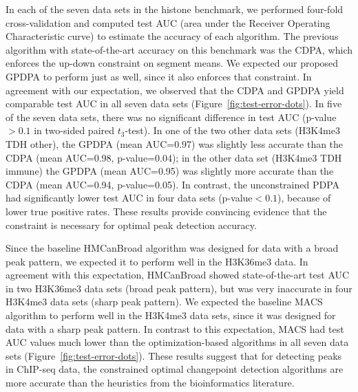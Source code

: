 \documentclass[aoas]{imsart}
\begin{document}
In each of the seven data sets in the histone benchmark,
we performed four-fold cross-validation and computed test AUC (area
under the Receiver Operating Characteristic curve) to estimate the
accuracy of each algorithm. The previous algorithm with
state-of-the-art accuracy on this benchmark was the CDPA, which
enforces the up-down constraint on segment means. We expected our
proposed GPDPA to perform just as well, since it also enforces that
constraint. In agreement with our expectation, we observed that the
CDPA and GPDPA yield comparable test AUC in all seven data sets
(Figure~\ref{fig:test-error-dots}). In five of the seven data sets,
there was no significant difference in test AUC (p-value$>0.1$ in
two-sided paired $t_3$-test). In one of the two other data sets
(H3K4me3 TDH other), the GPDPA (mean AUC=0.97) was slightly less
accurate than the CDPA (mean AUC=0.98, p-value=0.04); in the other
data set (H3K4me3 TDH immune) the GPDPA (mean AUC=0.95) was slightly
more accurate than the CDPA (mean AUC=0.94, p-value=0.05). In contrast, the
unconstrained PDPA had significantly lower test AUC in four data sets
(p-value$<0.1$), because of lower true positive rates. These results
provide convincing evidence that the constraint is necessary for
optimal peak detection accuracy.

Since the baseline HMCanBroad algorithm was designed for data with a
broad peak pattern, we expected it to perform well in the H3K36me3
data. In agreement with this expectation, HMCanBroad showed
state-of-the-art test AUC in two H3K36me3 data sets (broad peak
pattern), but was very inaccurate in four H3K4me3 data sets (sharp
peak pattern). We expected the baseline MACS algorithm to perform well
in the H3K4me3 data sets, since it was designed for data with a sharp
peak pattern. In contrast to this expectation, MACS had test AUC
values much lower than the optimization-based algorithms in all seven
data sets (Figure~\ref{fig:test-error-dots}). These results suggest
that for detecting peaks in ChIP-seq data, the constrained optimal
changepoint detection algorithms are more accurate than the heuristics
from the bioinformatics literature.


%   
\end{document}
